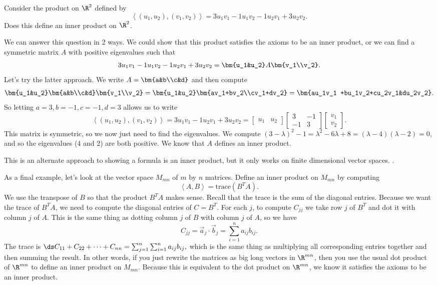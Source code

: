 \begin{example}
Consider the product on $\R^2$ defined by 
$$\left<(u_1, u_2),(v_1,v_2)\right> =3u_1v_1-1u_1v_2-1u_2v_1+3u_2v_2.$$ Does this define an inner product on $\R^2$.

We can answer this question in 2 ways.  
We could show that this product satisfies the axioms to be an inner product, or we can find a symmetric matrix $A$ with positive eigenvalues such that 
$$3u_1v_1-1u_1v_2-1u_2v_1+3u_2v_2= \bm{u_1&u_2}A \bm{v_1\\v_2}.$$
Let's try the latter approach.  We write $A = \bm{a&b\\c&d}$ and then compute 
$$\bm{u_1&u_2}\bm{a&b\\c&d} \bm{v_1\\v_2} 
=\bm{u_1&u_2}\bm{av_1+bv_2\\cv_1+dv_2}
=\bm{au_1v_1 +bu_1v_2+cu_2v_1&du_2v_2}.$$
So letting $a=3, b = -1, c=-1, d=3$ allows us to write
$$\left<(u_1, u_2),(v_1,v_2)\right> =3u_1v_1-1u_2v_1+3u_2v_2=
\begin{bmatrix}u_1&u_2\end{bmatrix}
\begin{bmatrix}3&-1\\-1&3\end{bmatrix}
\begin{bmatrix}v_1\\v_2\end{bmatrix}.
$$ 
This matrix is symmetric, so we now just need to find the eigenvalues. 
We compute $(3-\lambda)^2-1 = \lambda^2-6\lambda+8 = (\lambda-4)(\lambda-2) = 0$, and so the eigenvalues (4 and 2) are both positive. We know that $A$ defines an inner product. 

This is an alternate approach to showing a formula is an inner product, but it only works on finite dimensional vector spaces. 
.
\end{example}


As a final example, let's look at the vector space $M_{mn}$ of $m$ by $n$ matrices.  
Define an inner product on $M_{mn}$ by computing $$\left<A,B\right>= \text{trace}(B^T A).$$ 
We use the transpose of $B$ so that the product $B^TA$ makes sense. 
Recall that the trace is the sum of the diagonal entries.  
Because we want the trace of $B^TA$, we need to compute the diagonal entries of $C=B^T$.  
For each $j$, to compute $C_{jj}$ we take row $j$ of $B^T$ and dot it with column $j$ of $A$.  
This is the same thing as dotting column $j$ of $B$ with column $j$ of $A$, so we have 
$$C_{jj} = \vec a_j \cdot \vec b_j = \sum_{i=1}^n a_{ij}b_{ij}.$$
The trace is $\ds C_{11}+C_{22}+\cdots+C_{nn} = \sum_{j=1}^n \sum_{i=1}^n a_{ij}b_{ij},$ which is the same thing as multiplying all corresponding entries together and then summing the result. 
In other words, if you just rewrite the matrices as big long vectors in $\R^{mn}$, then you use the usual dot product of $\R^{mn}$ to define an inner product on $M_{mn}$.  Because this is equivalent to the dot product on $\R^{mn}$, we know it satisfies the axioms to be an inner product.

